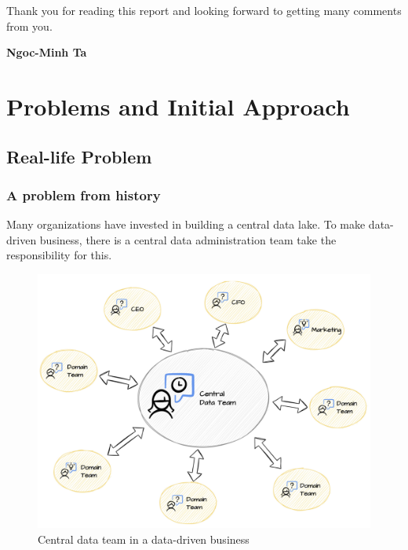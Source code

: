 \documentclass[12pt, a4paper]{book}
\begin{document}
Thank you for reading this report and looking forward to getting many comments from you.\\
\vspace{0.5cm}

\raggedleft
\textbf{Ngoc-Minh Ta}

\justifying
{}

        \tableofcontents
        \listoffigures
        \listoftables
    \endgroup
    
    \begingroup
        \frontmatter
        \justifying
        \let\cleardoublepage\clearpage
    \endgroup
    
    \mainmatter
    \justifying
    \normalsize
\chapter{Problems and Initial Approach}

\section{Real-life Problem}
\subsection{A problem from history}
Many organizations have invested in building a central data lake. To make data-driven business, there is a central data administration team take the responsibility for this.

\begin{figure}[h]
	\centering
	\includegraphics[width=14cm]{CentralDataTeam.png}
	\caption{Central data team in a data-driven business}
	\label{centraldata}
\end{figure}
\end{document}
